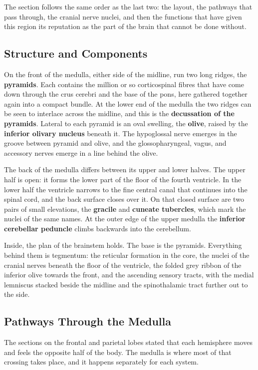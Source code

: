 \documentclass[11pt]{article}
\begin{document}
The section follows the same order as the last two: the layout, the pathways that pass through, the cranial nerve nuclei, and then the functions that have given this region its reputation as the part of the brain that cannot be done without.

\subsection{Structure and Components}

On the front of the medulla, either side of the midline, run two long ridges, the \textbf{pyramids}. Each contains the million or so corticospinal fibres that have come down through the crus cerebri and the base of the pons, here gathered together again into a compact bundle. At the lower end of the medulla the two ridges can be seen to interlace across the midline, and this is the \textbf{decussation of the pyramids}. Lateral to each pyramid is an oval swelling, the \textbf{olive}, raised by the \textbf{inferior olivary nucleus} beneath it. The hypoglossal nerve emerges in the groove between pyramid and olive, and the glossopharyngeal, vagus, and accessory nerves emerge in a line behind the olive.

The back of the medulla differs between its upper and lower halves. The upper half is open: it forms the lower part of the floor of the fourth ventricle. In the lower half the ventricle narrows to the fine central canal that continues into the spinal cord, and the back surface closes over it. On that closed surface are two pairs of small elevations, the \textbf{gracile} and \textbf{cuneate tubercles}, which mark the nuclei of the same names. At the outer edge of the upper medulla the \textbf{inferior cerebellar peduncle} climbs backwards into the cerebellum.

Inside, the plan of the brainstem holds. The base is the pyramids. Everything behind them is tegmentum: the reticular formation in the core, the nuclei of the cranial nerves beneath the floor of the ventricle, the folded grey ribbon of the inferior olive towards the front, and the ascending sensory tracts, with the medial lemniscus stacked beside the midline and the spinothalamic tract further out to the side.

\subsection{Pathways Through the Medulla}

The sections on the frontal and parietal lobes stated that each hemisphere moves and feels the opposite half of the body. The medulla is where most of that crossing takes place, and it happens separately for each system.
\end{document}
